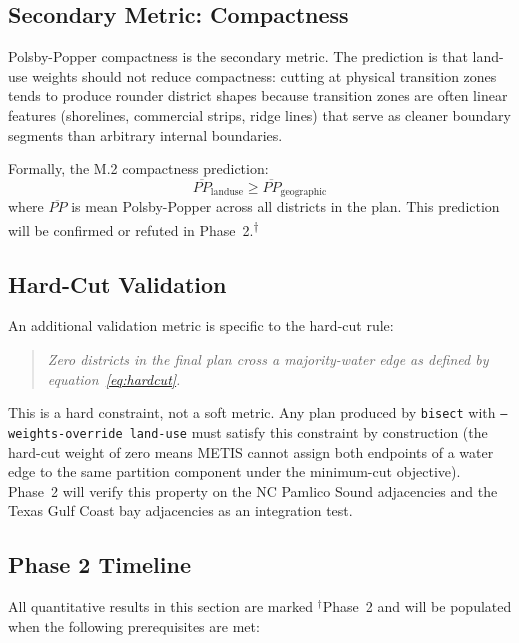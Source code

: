 \subsection{Secondary Metric: Compactness}

Polsby-Popper compactness \citep{polsby1991third} is the secondary metric.
The prediction is that land-use weights should not reduce compactness:
cutting at physical transition zones tends to produce rounder district shapes
because transition zones are often linear features (shorelines, commercial
strips, ridge lines) that serve as cleaner boundary segments than arbitrary
internal boundaries.

Formally, the M.2 compactness prediction:
\begin{equation}
  \overline{PP}_{\mathrm{landuse}} \geq \overline{PP}_{\mathrm{geographic}}
  \label{eq:pp}
\end{equation}
where $\overline{PP}$ is mean Polsby-Popper across all districts in the plan.
This prediction will be confirmed or refuted in Phase~2.\textsuperscript{$\dagger$}

\subsection{Hard-Cut Validation}

An additional validation metric is specific to the hard-cut rule:

\begin{quote}
  \textit{Zero districts in the final plan cross a majority-water edge
  as defined by equation~\eqref{eq:hardcut}.}
\end{quote}

This is a hard constraint, not a soft metric.
Any plan produced by \texttt{bisect} with \texttt{--weights-override land-use}
must satisfy this constraint by construction (the hard-cut weight of zero
means METIS cannot assign both endpoints of a water edge to the same
partition component under the minimum-cut objective).
Phase~2 will verify this property on the NC Pamlico Sound adjacencies
and the Texas Gulf Coast bay adjacencies as an integration test.

\subsection{Phase 2 Timeline}

All quantitative results in this section are marked ${}^{\dagger}$Phase~2
and will be populated when the following prerequisites are met:


